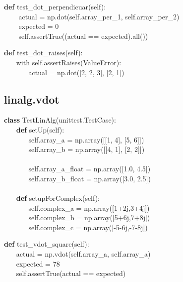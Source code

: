 \begin{algorithm}[H]
	
	\textbf{def} test\_dot\_perpendicuar(self):
	\\ $ ~~~~~~~~ $	actual = np.dot(self.array\_per\_1, self.array\_per\_2)
	\\ $ ~~~~~~~~ $	expected = 0
	\\ $ ~~~~~~~~ $	self.assertTrue((actual == expected).all())
\end{algorithm}


\begin{algorithm}[H]
    \textbf{def} test\_dot\_raises(self):
\\ $ ~~~~~~~~ $with self.assertRaises(ValueError):
\\ $ ~ ~~~~~~~~ ~~~~~~~ $actual = np.dot([2, 2, 3], [2, 1])
\end{algorithm}

\subsection{linalg.vdot}
\begin{algorithm}[H]
\textbf{class} TestLinAlg(unittest.TestCase):
\\ $ ~~~~~~~~ $\textbf{def} setUp(self):
\\ $ ~~~~~~~~~~~~~~~~ $self.array\_a = np.array([[1, 4], [5, 6]])
\\ $ ~~~~~~~~~~~~~~~~ $self.array\_b = np.array([[4, 1], [2, 2]])
\\
\\ $ ~~~~~~~~~~~~~~~~ $self.array\_a\_float = np.array([1.0, 4.5])
\\ $ ~~~~~~~~~~~~~~~~ $self.array\_b\_float = np.array([3.0, 2.5])
\\
\\ $ ~~~~~~~~ $\textbf{def} setupForComplex(self):
\\ $ ~~~~~~~~~~~~~~~~ $self.complex\_a = np.array([1+2j,3+4j])   
\\ $ ~~~~~~~~~~~~~~~~ $self.complex\_b = np.array([5+6j,7+8j])
\\ $ ~~~~~~~~~~~~~~~~ $self.complex\_c = np.array([-5-6j,-7-8j])
\end{algorithm}


\begin{algorithm}[H]
	\textbf{def} test\_vdot\_square(self):
	\\ $ ~~~~~~~~ $actual = np.vdot(self.array\_a, self.array\_a)
	\\ $ ~~~~~~~~ $expected = 78
	\\ $ ~~~~~~~~ $self.assertTrue(actual == expected)
\end{algorithm}

